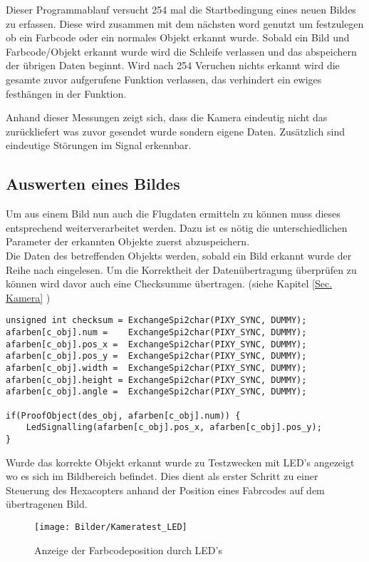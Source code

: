 Dieser Programmablauf versucht 254 mal die Startbedingung eines neuen Bildes zu erfassen. Diese wird zusammen mit dem nächsten word genutzt um festzulegen ob ein Farbcode oder ein normales Objekt erkannt wurde. Sobald ein Bild und Farbcode/Objekt erkannt wurde wird die Schleife verlassen und das abspeichern der übrigen Daten beginnt. Wird nach 254 Veruchen nichts erkannt wird die gesamte zuvor aufgerufene Funktion verlassen, das verhindert ein ewiges festhängen in der Funktion.


Anhand dieser Messungen zeigt sich, dass die Kamera eindeutig nicht das zurückliefert was zuvor gesendet wurde sondern eigene Daten. Zusätzlich sind eindeutige Störungen im Signal erkennbar.

\subsection{Auswerten eines Bildes}
Um aus einem Bild nun auch die Flugdaten ermitteln zu können muss dieses entsprechend weiterverarbeitet werden. Dazu ist es nötig die unterschiedlichen Parameter der erkannten Objekte zuerst abzuspeichern.
\\Die Daten des betreffenden Objekts werden, sobald ein Bild erkannt wurde der Reihe nach eingelesen. Um die Korrektheit der Datenübertragung überprüfen zu können wird davor auch eine Checksumme übertragen. (siehe Kapitel \ref{Sec. Kamera} )
\lstset{language = c}
\begin{lstlisting}
unsigned int checksum = ExchangeSpi2char(PIXY_SYNC, DUMMY);
afarben[c_obj].num =    ExchangeSpi2char(PIXY_SYNC, DUMMY);
afarben[c_obj].pos_x =  ExchangeSpi2char(PIXY_SYNC, DUMMY);
afarben[c_obj].pos_y =  ExchangeSpi2char(PIXY_SYNC, DUMMY);
afarben[c_obj].width =  ExchangeSpi2char(PIXY_SYNC, DUMMY);
afarben[c_obj].height = ExchangeSpi2char(PIXY_SYNC, DUMMY);
afarben[c_obj].angle =  ExchangeSpi2char(PIXY_SYNC, DUMMY);

if(ProofObject(des_obj, afarben[c_obj].num)) {
    LedSignalling(afarben[c_obj].pos_x, afarben[c_obj].pos_y);
}
\end{lstlisting}

Wurde das korrekte Objekt erkannt wurde zu Testzwecken mit LED's angezeigt wo es sich im Bildbereich befindet. Dies dient als erster Schritt zu einer Steuerung des Hexacopters anhand der Position eines Fabrcodes auf dem übertragenen Bild.
\begin{figure}[H]
  \begin{centering}
    \texttt{[image: Bilder/Kameratest\_LED]}
  \par\end{centering}
  \caption{Anzeige der Farbcodeposition durch LED's}
  \label{LED-Anzeige}
\end{figure}

